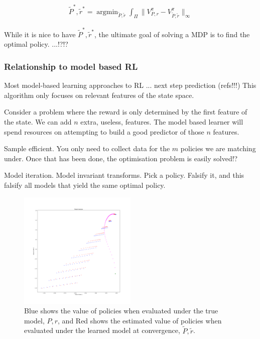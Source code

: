 \begin{align}
\tilde P^{* }, \tilde r^{* } = \mathop{\text{argmin}}_{\tilde P, \tilde r} \int_{\Pi} \parallel V^{\pi}_{P, r} -V^{\pi}_{\tilde P, \tilde r} \parallel_\infty
\end{align}

While it is nice to have $\tilde P^{* }, \tilde r^{* }$, the ultimate goal of
solving a MDP is to find the optimal policy. ...!?!?

\subsubsection{Relationship to model based RL}

Most model-based learning approaches to RL ... next step prediction (refs!!!)
This algorithm only focuses on relevant features of the state space.

Consider a problem where the reward is only determined by the first feature of the state. We can add $n$ extra, useless, features.
The model based learner will spend resources on attempting to build a good predictor of those $n$ features.

Sample efficient. You only need to collect data for the $m$ policies we are matching under.
Once that has been done, the optimisation problem is easily solved!?

Model iteration. Model invariant transforms. Pick a policy. Falsify it,
and this falsify all models that yield the same optimal policy.

\begin{figure}
\centering
\includegraphics[width=0.5\textwidth,height=0.5\textheight]{../../pictures/figures/model_iteration.png}
\caption{Blue shows the value of policies when evaluated under the true model, $P, r$,
and Red shows the estimated value of policies when evaluated under the learned model at convergence, $\tilde P, \tilde r$.}
\end{figure}


